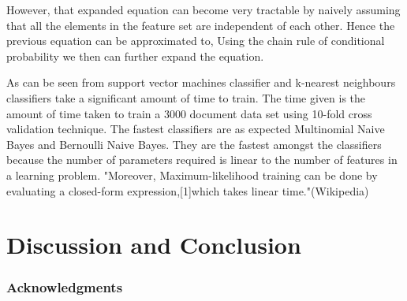 \documentclass{article} %
\begin{document}
However, that expanded equation can become very tractable by naively assuming that all the elements in the feature set are independent of each other. Hence the previous equation can be approximated to, Using the chain rule of conditional probability we then can further expand the equation. 


As can be seen from  support vector machines classifier and k-nearest neighbours classifiers take a significant amount of time to train. The time given is the amount of time taken to train a 3000 document data set using 10-fold cross validation technique. The fastest classifiers are as expected Multinomial Naive Bayes and Bernoulli Naive Bayes. They are the fastest amongst the classifiers because the number of parameters required is linear to the number of features in a learning problem. "Moreover,  Maximum-likelihood training can be done by evaluating a closed-form expression,[1]which takes linear time."(Wikipedia)\cite{Russell2003}







\section{Discussion and Conclusion}

\subsubsection*{Acknowledgments}




\end{document}
